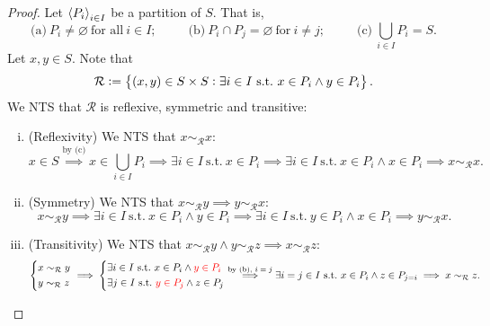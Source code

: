 \documentclass[11pt,openany]{article}
\begin{document}
\newpage
{}
\begin{proof}
	Let $\left\langle P_i \right\rangle_{i\in I}$ be a partition of $S$. That is, \[
	\text{(a)}\ P_i\neq\varnothing\ \text{for all}\ i\in I;\hspace{30pt}
	\text{(b)}\ P_i\cap P_j=\varnothing\ \text{for}\ i\neq j;\hspace{30pt}
	\text{(c)}\ \bigcup_{i\in I}P_i=S.
	\]
	Let $x,y\in S$. Note that \[
	\mathcal{R}:=\set{(x,y)\in S\times S: \exists i\in I\ \text{s.t.}\ x\in P_i\land y\in P_i}.
	\] We NTS that $\mathcal{R}$ is reflexive, symmetric and transitive:
	\begin{enumerate}[(i)]
		\item (Reflexivity) We NTS that $x\sim_{\mathcal{R}} x$: \[
		x\in S\overset{\text{by (c)}}{\implies} x\in \bigcup_{i\in I}P_i\implies \exists i\in I\ \text{s.t.}\ x\in P_i\implies \exists i\in I\ \text{s.t.}\ x\in P_i\land x\in P_i\implies x\sim_{\mathcal{R}} x.
		\]
		\item (Symmetry) We NTS that $x\sim_{\mathcal{R}} y\implies y\sim_{\mathcal{R}} x$:\[
		x\sim_{\mathcal{R}} y\implies \exists i\in I\ \text{s.t.}\ x\in P_i\land y\in P_i\implies \exists i\in I\ \text{s.t.}\ y\in P_i\land x\in P_i\implies y\sim_{\mathcal{R}} x.
		\]
		\item (Transitivity) We NTS that $x\sim_{\mathcal{R}} y\land y\sim_{\mathcal{R}} z\implies x\sim_{\mathcal{R}} z$:\[
		\begin{cases*}
			x\sim_{\mathcal{R}} y \\
			y\sim_{\mathcal{R}} z
		\end{cases*}\implies \begin{cases*}
		\exists i\in I\ \text{s.t.}\ x\in P_i\land \textcolor{red}{y\in P_i} \\
		\exists j\in I\ \text{s.t.}\ \textcolor{red}{y\in P_j}\land z\in P_j
	\end{cases*}\overset{\text{by (b), $i=j$}}{\implies}\exists i=j\in I\ \text{s.t.}\ x\in P_i\land z\in P_{j=i}\implies x\sim_{\mathcal{R}} z.
		\]
	\end{enumerate}
\end{proof}
\end{document}
